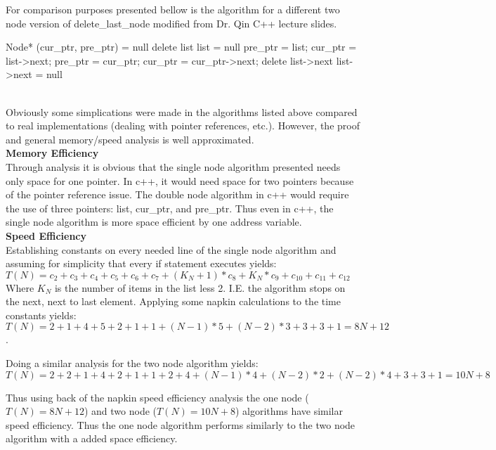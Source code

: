\documentclass{article}
\begin{document}
For comparison purposes presented bellow is the algorithm for a different two
node version of delete\_last\_node modified from Dr. Qin C++ lecture slides.\\

\begin{algorithmic}[1]
  \State Node* (cur\_ptr, pre\_ptr) = null
  \State {}
  \EndIf
  \State delete list
  \State list = null
  \State {}
  \EndIf
  \State pre\_ptr = list;
  \State cur\_ptr = list-\textgreater next;
  \State pre\_ptr = cur\_ptr;
  \State cur\_ptr = cur\_ptr-\textgreater next;
  \EndWhile
  \State delete list-\textgreater next
  \State list-\textgreater next = null
  \State {}
  \EndFunction
\end{algorithmic}

\text{}\\

Obviously some simplications were made in the algorithms listed above compared
to real implementations (dealing with pointer references, etc.). However, the
proof and general memory/speed analysis is well approximated.\\
\textbf{Memory Efficiency}\\

Through analysis it is obvious that the single node algorithm presented needs
only space for one pointer. In c++, it would need space for two pointers
because of the pointer reference issue. The double node algorithm in c++ would
require the use of three pointers: list, cur\_ptr, and pre\_ptr. Thus even in
c++, the single node algorithm is more space efficient by one address
variable.\\
\textbf{Speed Efficiency}\\

Establishing constants on every needed line of the single node algorithm and
assuming for simplicity that every if statement executes
yields: $T(N) = c_2 + c_3 + c_4 + c_5 + c_6 + c_7 + (K_N + 1) * c_8 + K_N *
c_9 + c_{10} + c_{11} + c_{12}$ Where $K_N$ is the number of items in the list
less 2. I.E. the algorithm stops on the next, next to last element. Applying
some napkin calculations to the time constants yields: $T(N) = 2 + 1 + 4 + 5 +
2 + 1 +1 + (N-1)*5 + (N-2)*3 + 3 + 3 + 1 = 8N + 12$.

Doing a similar analysis for the two node algorithm yields: $T(N) = 2 + 2 + 1
+ 4 + 2 + 1 + 1 + 2 + 4 + (N-1)*4 + (N-2)*2 + (N-2)*4 + 3 + 3 + 1 = 10N + 8$

Thus using back of the napkin speed efficiency analysis the one node ($T(N) =
8N + 12$)  and two
node ($T(N) = 10N + 8$) algorithms have similar speed efficiency. Thus the one
node algorithm performs similarly to the two node algorithm with a added space efficiency.
\end{document}
